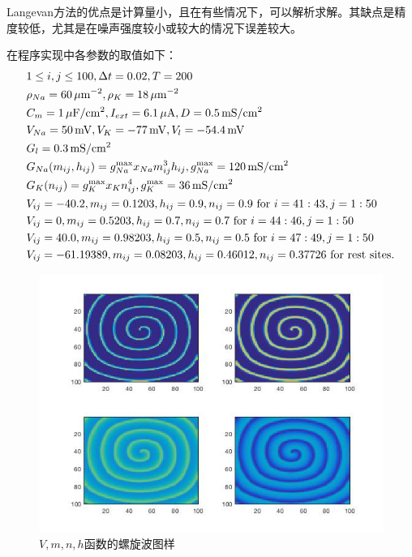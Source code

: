 \documentclass[
pdflinks,
]{xjtuthesis}
\begin{document}
Langevan方法的优点是计算量小，且在有些情况下，可以解析求解。其缺点是精度较低，尤其是在噪声强度较小或较大的情况下误差较大。

\newcommand{\cm}{\mathrm{cm}}
\newcommand{\ms}{\,\mathrm{mS}}
\newcommand{\mv}{\,\mathrm{mV}}
\newcommand{\um}{\,\mathrm{\mu m}}
\newcommand{\uf}{\,\mathrm{\mu F}}
\newcommand{\ua}{\,\mathrm{\mu A}}

在程序实现中各参数的取值如下：
\begin{align*}
& 1 \le i,j \le 100, \Delta t = 0.02, T = 200 \\
& \rho_{Na} = 60 \um^{-2}, \rho_{K} = 18 \um^{-2}\\
& C_m = 1 \uf / \cm ^2, I _{ext} = 6.1 \ua, D = 0.5 \ms / \cm ^2\\
& \vna = 50 \mv, \vk = -77 \mv, \vl = -54.4 \mv\\
& \gl = 0.3 \ms / \cm^2\\
& \gna (m_{ij}, h_{ij}) = g _{Na} ^{\max} x _{Na} m ^3 _{ij} h _{ij}, g ^{\max} _{Na} = 120 \ms / \cm ^2\\
& \gk (n_{ij}) = g_{K} ^{\max} x_{K} n^4 _{ij}, g_{K} ^{\max} = 36 \ms / \cm ^2 \\
& V_{ij}=-40.2, m_{ij}=0.1203, h_{ij}=0.9, n_{ij}=0.9 \text{ for } i=41:43, j = 1 : 50 \\
& V_{ij}=0, m_{ij}=0.5203, h_{ij}=0.7, n_{ij}=0.7 \text{ for } i = 44 : 46, j = 1 : 50\\
& V_{ij}=40.0, m_{ij}=0.98203, h_{ij}=0.5, n_{ij}=0.5 \text{ for } i = 47 : 49, j = 1 : 50\\
& V_{ij}=-61.19389, m_{ij}=0.08203, h _{ij}=0.46012, n_{ij}=0.37726 \text{ for rest sites.}\\
\end{align*}

\clearpage

\begin{figure}[!ht]
\centering
\includegraphics[scale=0.68]{figures/xin_1.jpg}
\caption{$V,m,n,h$函数的螺旋波图样}
\end{figure}
\end{document}
